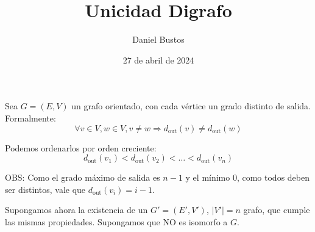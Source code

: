 \documentclass{article}
\title{Unicidad Digrafo}
\author{Daniel Bustos}
\date{27 de abril de 2024}
\begin{document}
\maketitle

Sea $G = (E,V)$ un grafo orientado, con cada vértice un grado distinto de salida. Formalmente:
\[
\forall v \in V, w \in V, v \neq w \Rightarrow d_{\text{out}}(v) \neq d_{\text{out}}(w)
\]

Podemos ordenarlos por orden creciente:
\[
d_{\text{out}}(v_1) < d_{\text{out}}(v_2) < \ldots < d_{\text{out}}(v_n)
\]

OBS: Como el grado máximo de salida es $n - 1$ y el mínimo $0$, como todos deben ser distintos, vale que $d_{\text{out}}(v_i) = i - 1$.

Supongamos ahora la existencia de un $G' = (E',V')$, $|V'| = n$ grafo, que cumple las mismas propiedades. Supongamos que NO es isomorfo a $G$.
\end{document}
